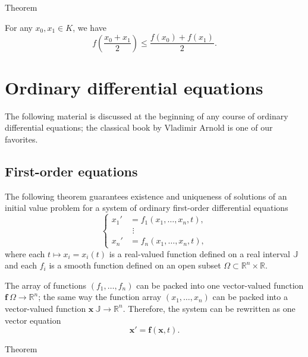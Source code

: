 \begin{multicols}{2}
{\begin{thm}{Theorem}
\begin{subthm}{}
For any $x_0,x_1\in K$, we have 
\[f \left (\frac{x_0 + x_1}2 \right ) \le \frac{f(x_0) + f(x_1)}2.\]
\end{subthm}

\end{thm}




\section{Ordinary differential equations}

The following material is discussed at the beginning of any course of ordinary differential equations; the classical book by Vladimir Arnold \cite{arnold} is one of our favorites.


\subsection*{First-order equations}

The following theorem guarantees existence and uniqueness of solutions of an initial value problem
for a system of ordinary first-order differential equations
\[
\begin{cases}
x_1'&=f_1(x_1,\dots,x_n,t),
\\
&\,\,\vdots
\\
x_n'&=f_n(x_1,\dots,x_n,t),
\end{cases}
\]
where each $t\mapsto x_i=x_i(t)$ is a real-valued function defined on a real interval $\mathbb{J}$
and each $f_i$ is a smooth function defined on an open subset $\Omega\subset \mathbb{R}^n\times \mathbb{R}$.

The array of functions $(f_1,\dots,f_n)$ can be packed into one vector-valued function 
$\bm{f}\:\Omega\to \mathbb{R}^n$;
the same way the function array $(x_1,\dots,x_n)$ can be packed into a vector-valued function  $\bm{x}\:\mathbb{J}\to\mathbb{R}^n$.
Therefore, the system can be rewritten as one vector equation 
\[\bm{x}'=\bm{f}(\bm{x}, t).\] 

\begin{thm}{Theorem}\label{thm:ODE}


\end{thm}}
\end{multicols}
